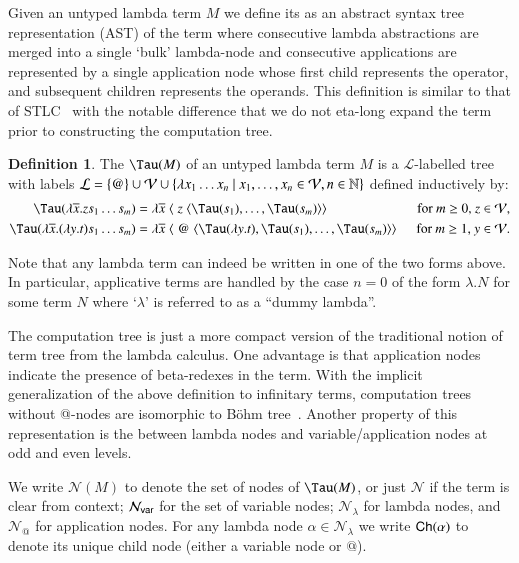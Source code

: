 \documentclass{elsarticle}
\makeatletter
\theoremstyle{plain}
\theoremstyle{definition}
\newtheorem{definition}{Definition}[section]
\theoremstyle{remark}
\newcommand\VarSet{\mathcal{V}}
\newcommand\Nodes{\mathcal{N}}%
\newcommand\NodesVar{\Nodes_{\sf var}}%
\newcommand\NodesLmd{\Nodes_\lambda}%
\newcommand\NodesApp{\Nodes_@}%
\newcommand{\child}{{\small \sf Ch}} %
\newcommand{\ctree}{\Tau} %
\makeatother
\begin{document}
Given an untyped lambda term $M$ we define its  as an abstract syntax tree representation
(AST) of the term where consecutive lambda abstractions are merged into a single `bulk' lambda-node and consecutive applications are represented by a single application node whose first child represents the operator, and subsequent children represents the operands.
This definition is similar to that of STLC~\cite{OngLics2006, BlumPhd} with the notable difference that we do not eta-long expand the term prior to constructing the computation tree.
\begin{definition}
The  $\ctree(M)$ of an
 untyped lambda term $M$ is a $\mathcal{L}$-labelled tree
with labels
$\mathcal{L} = \{ @ \} \union \VarSet \union \{ \lambda x_1 \ldots x_n \ | \ x_1 ,\ldots, x_n \in
    \VarSet, n\in\nat \}$
defined inductively by:
\begin{align*}
    \ctree(\lambda \overline{x} . z s_1 \ldots s_m) &= \lambda \overline{x}\; \langle\; z\; \langle \ctree(s_1),\ldots,\ctree(s_m)\rangle\rangle
&    \hbox{for $m\geq 0$, $z \in \VarSet$},
\\
\ctree(\lambda \overline{x} . (\lambda y.t) s_1 \ldots s_m) &= \lambda \overline{x}\; \langle\; @ \; \langle \ctree(\lambda y.t),\ctree(s_1),\ldots,\ctree(s_m) \rangle \rangle \enspace
&  \hbox{for $m\geq 1$, $y\in \VarSet$}.
\end{align*}

Note that any lambda term can indeed be written in one of the two forms above. In particular, applicative terms are handled by the case $n=0$ of the form $\lambda . N$ for some term $N$ where `$\lambda$' is referred to as a ``dummy lambda''.

The computation tree is just a more compact version of the traditional notion of term tree from the lambda calculus. One advantage is that application nodes indicate the presence of beta-redexes in the term.
With the implicit generalization of the above definition to infinitary terms,
computation trees without @-nodes are isomorphic to B\"ohm tree~\cite{Barendregt84}.
Another property of this representation is the  between lambda nodes and variable/application nodes at odd and even levels.

We write $\Nodes(M)$ to denote the set of nodes of $\ctree(M)$, or just $\Nodes$ if the term is clear from context; $\NodesVar$ for the set of variable nodes; $\NodesLmd$ for lambda nodes, and $\NodesApp$ for  application nodes. For any lambda node $\alpha\in\NodesLmd$ we write $\child(\alpha)$ to denote its unique child node (either a variable node or $@$).
\end{definition}
\end{document}
